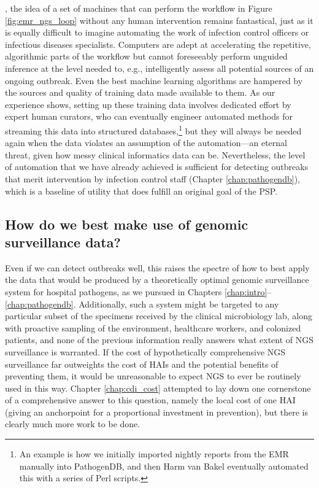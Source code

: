 , the idea of a set of machines that can perform the workflow in Figure \ref{fig:emr_ngs_loop} without any human intervention remains fantastical, just as it is equally difficult to imagine automating the work of infection control officers or infectious diseases specialists. Computers are adept at accelerating the repetitive, algorithmic parts of the workflow but cannot foreseeably perform unguided inference at the level needed to, e.g., intelligently assess all potential sources of an ongoing outbreak. Even the best machine learning algorithms are hampered by the sources and quality of training data made available to them. As our experience shows, setting up these training data involves dedicated effort by expert human curators, who can eventually engineer automated methods for streaming this data into structured databases,\footnote{An example is how we initially imported nightly reports from the EMR manually into PathogenDB, and then Harm van Bakel eventually automated this with a series of Perl scripts.} but they will always be needed again when the data violates an assumption of the automation—an eternal threat, given how messy clinical informatics data can be. Nevertheless, the level of automation that we have already achieved is sufficient for detecting outbreaks that merit intervention by infection control staff (Chapter \ref{chap:pathogendb}), which is a baseline of utility that does fulfill an original goal of the PSP.

\subsection{How do we best make use of genomic surveillance data?}

Even if we can detect outbreaks well, this raises the spectre of how to best apply the data that would be produced by a theoretically optimal genomic surveillance system for hospital pathogens, as we pursued in Chapters \ref{chap:intro}–\ref{chap:pathogendb}. Additionally, such a system might be targeted to any particular subset of the specimens received by the clinical microbiology lab, along with proactive sampling of the environment, healthcare workers, and colonized patients, and none of the previous information really answers what extent of NGS surveillance is warranted. If the cost of hypothetically comprehensive NGS surveillance far outweights the cost of HAIs and the potential benefits of preventing them, it would be unreasonable to expect NGS to ever be routinely used in this way. Chapter \ref{chap:cdi_cost} attempted to lay down one cornerstone of a comprehensive answer to this question, namely the local cost of one HAI (giving an anchorpoint for a proportional investment in prevention), but there is clearly much more work to be done.

